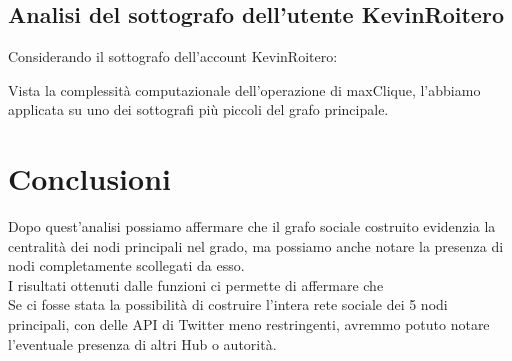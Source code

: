 \documentclass[a4paper,11pt]{report}
\begin{document}
\section{Analisi del sottografo dell'utente KevinRoitero}
Considerando il sottografo dell'account KevinRoitero:

Vista la complessità computazionale dell'operazione di maxClique, l'abbiamo applicata su uno dei sottografi più piccoli del grafo principale.

\pagebreak

\chapter{Conclusioni}
Dopo quest'analisi possiamo affermare che il grafo sociale costruito evidenzia la centralità dei nodi principali nel grado, ma possiamo anche notare la presenza di nodi completamente scollegati da esso.\\
I risultati ottenuti dalle funzioni ci permette di affermare che \\
Se ci fosse stata la possibilità di costruire l'intera rete sociale dei 5 nodi principali, con delle API di Twitter meno restringenti, avremmo potuto notare l'eventuale presenza di altri Hub o autorità.
\pagebreak
\end{document}

